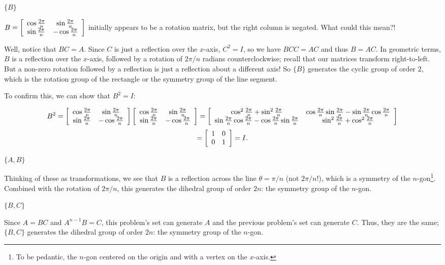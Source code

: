 \documentclass[../key.tex]{subfiles}
\begin{document}
\begin{inner_problem}
\item $\{B\}$
\end{inner_problem}

$B=\left[\begin{array}{cc} \cos\frac{2\pi}{n} & \sin\frac{2\pi}{n} \\ \sin\frac{2\pi}{n} & -\cos\frac{2\pi}{n} \end{array}\right]$ initially appears to be a rotation matrix, but the right column is negated. What could this mean?!

Well, notice that $BC = A$. Since $C$ is just a reflection over the $x$-axis, $C^2=I$, so we have $BCC=AC$ and thus $B=AC$. In geometric terms, $B$ is a reflection over the $x$-axis, followed by a rotation of $2\pi/n$ radians counterclockwise; recall that our matrices transform right-to-left. But a non-zero rotation followed by a reflection is just a reflection about a different axis! So $\{B\}$ generates the cyclic group of order $2$, which is the rotation group of the rectangle or the symmetry group of the line segment.

To confirm this, we can show that $B^2 = I$:

$$B^2 = \left[\begin{array}{cc} \cos\frac{2\pi}{n} & \sin\frac{2\pi}{n} \\ \sin\frac{2\pi}{n} & -\cos\frac{2\pi}{n} \end{array}\right]\left[\begin{array}{cc} \cos\frac{2\pi}{n} & \sin\frac{2\pi}{n} \\ \sin\frac{2\pi}{n} & -\cos\frac{2\pi}{n} \end{array}\right] = \left[\begin{array}{cc} \cos^2\frac{2\pi}{n}+\sin^2\frac{2\pi}{n} & \cos\frac{2\pi}{n}\sin\frac{2\pi}{n}-\sin\frac{2\pi}{n}\cos\frac{2\pi}{n} \\ \sin\frac{2\pi}{n}\cos\frac{2\pi}{n}-\cos\frac{2\pi}{n}\sin\frac{2\pi}{n} & \sin^2\frac{2\pi}{n}+\cos^2\frac{2\pi}{n} \end{array}\right]$$
$$ = \left[\begin{array}{cc} 1 & 0 \\ 0 & 1 \end{array}\right] = I.$$

\begin{inner_problem}
\item $\{A,B\}$
\end{inner_problem}

Thinking of these as transformations, we see that $B$ is a reflection across the line $\theta=\pi/n$ (not $2\pi/n$!), which is a symmetry of the $n$-gon\footnote{To be pedantic, the $n$-gon centered on the origin and with a vertex on the $x$-axis.}. Combined with the rotation of $2\pi/n$, this generates the dihedral group of order $2n$: the symmetry group of the $n$-gon.

\begin{inner_problem}
\item $\{B,C\}$
\end{inner_problem}

Since $A=BC$ and $A^{n-1}B=C$, this problem's set can generate $A$ and the previous problem's set can generate $C$. Thus, they are the same; $\{B,C\}$ generates the dihedral group of order $2n$: the symmetry group of the $n$-gon.
\end{document}
